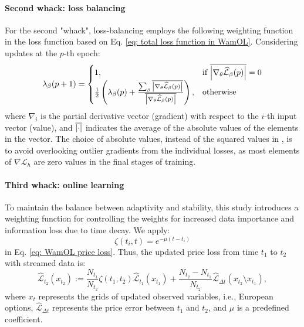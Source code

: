 \documentclass[sigconf, authorversion=true, nonacm=true]{acmart}
\begin{document}
\paragraph{Second whack: loss balancing}
For the second "whack", loss-balancing employs the following weighting function in the loss function based on Eq. \eqref{eq: total loss function in WamOL}. Considering updates at the $p$-th epoch:
\begin{equation}
    \lambda_\beta(p+1) = \begin{cases}{1}, & \text{if $\overline{\abs{\nabla_\theta\widehat{\mathcal{L}}_\beta(p)}}=0$} \\ \frac{1}{2}\left(\lambda_\beta(p) + \frac{\sum_\beta \overline{\abs{\nabla_\theta\widehat{\mathcal{L}}_\beta(p)}}}{\overline{\abs{\nabla_\theta\widehat{\mathcal{L}}_\beta(p)}}}\right), & \text{otherwise} \end{cases}
\end{equation}
where $\nabla_i$ is the partial derivative vector (gradient) with respect to the $i$-th input vector (value), and $\overline{\abs{\cdot}}$ indicates the average of the absolute values of the elements in the vector. The choice of absolute values, instead of the squared values in \cite{wang2023expert}, is to avoid overlooking outlier gradients from the individual losses, as most elements of $\nabla\mathcal{L}_h$ are zero values in the final stages of training.

\paragraph{Third whack: online learning}
To maintain the balance between adaptivity and stability, this study introduces a weighting function for controlling the weights for increased data importance and information loss due to time decay. We apply:
\begin{equation}
\zeta(t_i, t) = e^{-\mu (t-t_i)}
\end{equation}
in Eq. \eqref{eq: WamOL price loss}. Thus, the updated price loss from time $t_1$ to $t_2$ with streamed data is:
\begin{equation}
    \widehat{\mathcal{L}}_{t_2}\left(x_{t_2}\right) := \frac{N_{t_1}}{N_{t_2}}\zeta\left(t_1, t_2\right) \widehat{\mathcal{L}}_{t_1}\left(x_{t_1}\right) + \frac{N_{t_2} - N_{t_1}}{N_{t_2}} \widehat{\mathcal{L}}_{\Delta t}\left(x_{t_2} \setminus x_{t_1}\right),
\end{equation}
where $x_t$ represents the grids of updated observed variables, i.e., European options, $\widehat{\mathcal{L}}_{\Delta t}$ represents the price error between $t_1$ and $t_2$, and $\mu$ is a predefined coefficient.
\end{document}
